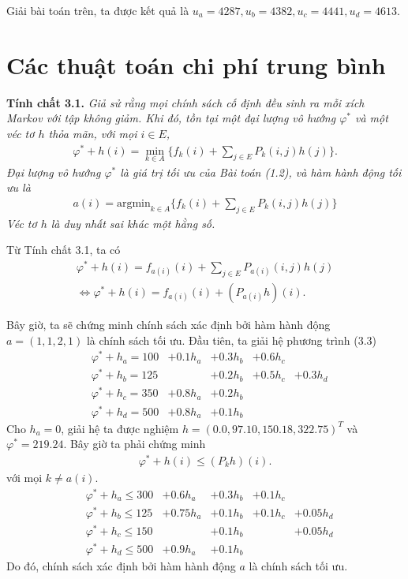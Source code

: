 \documentclass[12pt,a4paper]{report}
\begin{document}
   Giải bài toán trên, ta được kết quả là $u_a=4287, u_b=4382, u_c=4441, u_d=4613$.
    \chapter{Các thuật toán chi phí trung bình}
    \begin{shaded*}
    	\noindent
    	\textbf{Tính chất 3.1. } \textit{Giả sử rằng mọi chính sách cố định đều sinh ra mỗi xích Markov với tập không giảm. Khi đó, tồn tại một đại lượng vô hướng $\varphi^*$ và một véc tơ $h$ thỏa mãn, với mọi $i \in E$,
    		\begin{align}
    		\varphi^*+h(i)=\underset{k \in A}{\min}\{f_k(i)+\sum_{j \in E}P_k(i,j)h(j)\}.
    		\end{align}
    		Đại lượng vô hướng $\varphi ^*$ là giá trị tối ưu của Bài toán (1.2), và hàm hành động tối ưu là
    		\begin{align*}
    		a(i)=\mathrm{argmin}_{k\in A}\{f_k(i)+\sum_{j\in E}P_k(i,j)h(j)\}
    		\end{align*}
    		Véc tơ $h$ là duy nhất sai khác một hằng số.
    	} 
    \end{shaded*}    
   Từ Tính chất 3.1, ta có
   \begin{align}
   \varphi^*+h(i)=f_{a(i)}(i)+\sum_{j \in E}P_{a(i)}(i,j)h(j)\\
   \Leftrightarrow \varphi^*+h(i)=f_{a(i)}(i)+(P_{a(i)}h)(i).
   \end{align}
   
    Bây giờ, ta sẽ chứng minh chính sách xác định bởi hàm hành động $a=(1,1,2,1)$ là chính sách tối ưu. Đầu tiên, ta giải hệ phương trình (3.3)
    \begin{align*}
    &\varphi^*+h_a=100&+0.1h_a&+0.3h_b&+0.6h_c\\
    &\varphi^*+h_b=125&&+0.2h_b&+0.5h_c&+0.3h_d\\
    &\varphi^*+h_c=350&+0.8h_a&+0.2h_b\\
    &\varphi^*+h_d=500&+0.8h_a&+0.1h_b
    \end{align*}
    Cho $h_a=0$, giải hệ ta được nghiệm $h=(0.0, 97.10, 150.18, 322.75)^T$ và $\varphi^*=219.24$. Bây giờ ta phải chứng minh
    \begin{align*}
    \varphi^*+h(i) \leq (P_k h)(i).
    \end{align*}
    với mọi $k \neq a(i)$.
       \begin{align*}
    &\varphi^*+h_a \leq 300&+0.6h_a&+0.3h_b&+0.1h_c\\
    &\varphi^*+h_b \leq 125&+0.75h_a&+0.1h_b&+0.1h_c&+0.05h_d\\
    &\varphi^*+h_c \leq 150&&+0.1h_b&&+0.05h_d\\
    &\varphi^*+h_d \leq 500&+0.9h_a&+0.1h_b
    \end{align*}
    Do đó, chính sách xác định bởi hàm hành động $a$ là chính sách tối ưu.
    
\end{document}
